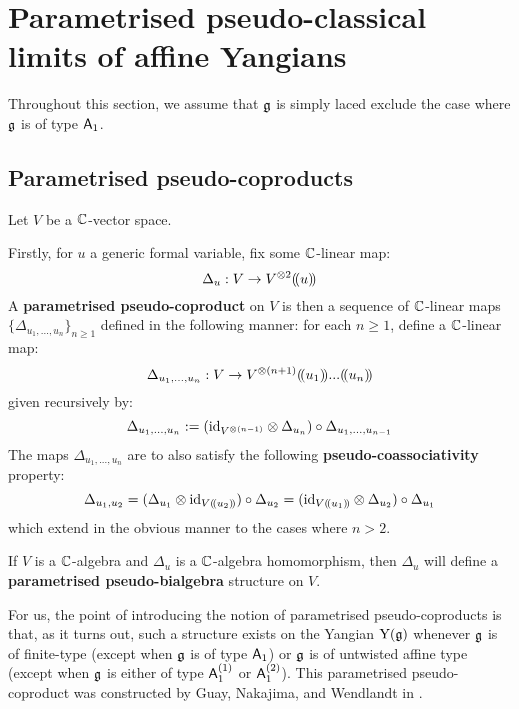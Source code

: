\section{Parametrised pseudo-classical limits of affine Yangians}
    \begin{convention}
        Throughout this section, we assume that $\mathfrak{g}$ is simply laced exclude the case where $\mathfrak{g}$ is of type $\mathsf{A}_1$. 
    \end{convention}

    \subsection{Parametrised pseudo-coproducts}
        \begin{definition} \label{def: parametrised_pseudo_coproducts}
            Let $V$ be a $\mathbb{C}$-vector space. 

            Firstly, for $u$ a generic formal variable, fix some $\mathbb{C}$-linear map:
                $$\Delta_u: V \to V^{\tensor 2}(\!(u)\!)$$
            A \textbf{parametrised pseudo-coproduct} on $V$ is then a sequence of $\mathbb{C}$-linear maps $\{\Delta_{u_1, ..., u_n}\}_{n \geq 1}$ defined in the following manner: for each $n \geq 1$, define a $\mathbb{C}$-linear map:
                $$\Delta_{u_1, ..., u_n}: V \to V^{\tensor (n + 1)}(\!(u_1)\!) ... (\!(u_n)\!)$$
            given recursively by:
                $$\Delta_{u_1, ..., u_n} := ( \id_{ V^{\tensor (n - 1)} } \tensor \Delta_{u_n} ) \circ \Delta_{u_1, ..., u_{n - 1}}$$
            The maps $\Delta_{u_1, ..., u_n}$ are to also satisfy the following \textbf{pseudo-coassociativity} property:
                $$\Delta_{u_1, u_2} = ( \Delta_{u_1} \tensor \id_{V(\!(u_2)\!)} ) \circ \Delta_{u_2} = ( \id_{V(\!(u_1)\!)} \tensor \Delta_{u_2} ) \circ \Delta_{u_1}$$
            which extend in the obvious manner to the cases where $n > 2$. 

            If $V$ is a $\mathbb{C}$-algebra and $\Delta_u$ is a $\mathbb{C}$-algebra homomorphism, then $\Delta_u$ will define a \textbf{parametrised pseudo-bialgebra} structure on $V$.
        \end{definition}
        For us, the point of introducing the notion of parametrised pseudo-coproducts is that, as it turns out, such a structure exists on the Yangian $\mathrm{Y}(\mathfrak{g})$ whenever $\mathfrak{g}$ is of finite-type (except when $\mathfrak{g}$ is of type $\mathsf{A}_1$) or $\mathfrak{g}$ is of untwisted affine type (except when $\mathfrak{g}$ is either of type $\mathsf{A}_1^{(1)}$ or $\mathsf{A}_1^{(2)}$). This parametrised pseudo-coproduct was constructed by Guay, Nakajima, and Wendlandt in \cite[Section 6]{guay_nakajima_wendlandt_affine_yangian_coproduct}.
